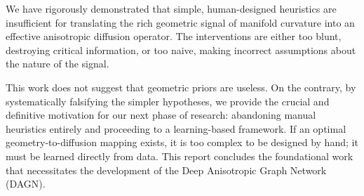 \documentclass[11pt, a4paper]{article}
\begin{document}
We have rigorously demonstrated that simple, human-designed heuristics are insufficient for translating the rich geometric signal of manifold curvature into an effective anisotropic diffusion operator. The interventions are either too blunt, destroying critical information, or too naive, making incorrect assumptions about the nature of the signal.

This work does not suggest that geometric priors are useless. On the contrary, by systematically falsifying the simpler hypotheses, we provide the crucial and definitive motivation for our next phase of research: abandoning manual heuristics entirely and proceeding to a learning-based framework. If an optimal geometry-to-diffusion mapping exists, it is too complex to be designed by hand; it must be learned directly from data. This report concludes the foundational work that necessitates the development of the Deep Anisotropic Graph Network (DAGN).
\end{document}
